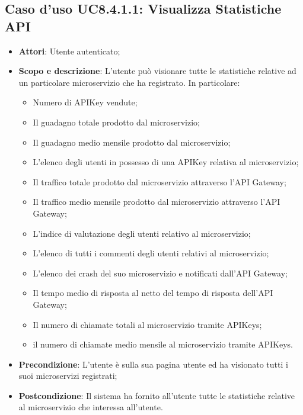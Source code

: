 \documentclass[12pt,a4paper,titlepage]{article}
\begin{document}
	\subsection{Caso d'uso UC8.4.1.1: Visualizza Statistiche API}
	\label{UC8.4.1.1}
	\begin{itemize}
		\item \textbf{Attori}: Utente autenticato;
		\item \textbf{Scopo e descrizione}: L'utente può visionare tutte le statistiche relative ad un particolare microservizio che ha registrato. In particolare:
		\begin{itemize}
			\item Numero di APIKey vendute;
			\item Il guadagno totale prodotto dal microservizio;
			\item Il guadagno medio mensile prodotto dal microservizio;
			\item L'elenco degli utenti in possesso di una APIKey relativa al microservizio;
			\item Il traffico totale prodotto dal microservizio attraverso l'API Gateway;
			\item Il traffico medio mensile prodotto dal microservizio attraverso l'API Gateway;
			\item L'indice di valutazione degli utenti relativo al microservizio;
			\item L'elenco di tutti i commenti degli utenti relativi al microservizio;
			\item L'elenco dei crash del suo microservizio e notificati dall'API Gateway;
			\item Il tempo medio di risposta al netto del tempo di risposta dell'API Gateway;
			\item Il numero di chiamate totali al microservizio tramite APIKeys;
			\item il numero di chiamate medio mensile al microservizio tramite APIKeys.
		\end{itemize}
		\item \textbf{Precondizione}: L'utente è sulla sua pagina utente ed ha visionato tutti i suoi microservizi registrati;
		\item \textbf{Postcondizione}: Il sistema ha fornito all'utente tutte le statistiche relative al microservizio che interessa all'utente.
	\end{itemize}
\end{document}
